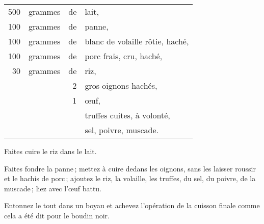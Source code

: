 \medskip

\footnotesize
\begin{longtable}{rrrp{18em}}
    500 & grammes & de & lait,                                                                            \\
    100 & grammes & de & panne,                                                                           \\
    100 & grammes & de & blanc de volaille rôtie, haché,                                                  \\
    100 & grammes & de & porc frais, cru, haché,                                                          \\
     30 & grammes & de & riz,                                                                             \\
        &         &  2 & gros oignons hachés,                                                             \\
        &         &  1 & œuf,                                                                             \\
        &         &    & truffes cuites, à volonté,                                                       \\
        &         &    & sel, poivre, muscade.                                                            \\
\end{longtable}
\normalsize

Faites cuire le riz dans le lait.

Faites fondre la panne ; mettez à cuire dedans les oignons, sans les laisser
roussir et le hachis de porc ; ajoutez le riz, la volaille, les truffes, du
sel, du poivre, de la muscade ; liez avec l'œuf battu.

Entonnez le tout dans un boyau et achevez l'opération de la cuisson finale
comme cela a été dit pour le boudin noir.
